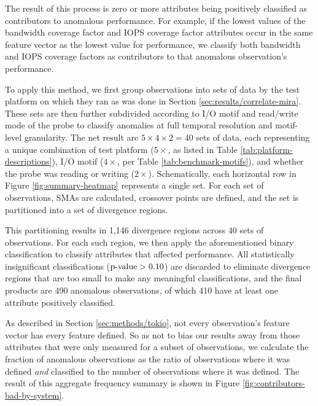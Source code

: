 The result of this process is zero or more attributes being positively classified as contributors to anomalous performance.
For example, if the lowest values of the bandwidth coverage factor and IOPS coverage factor attributes occur in the same feature vector as the lowest value for performance, we classify both bandwidth and IOPS coverage factors as contributors to that anomalous observation's performance.

To apply this method, we first group observations into sets of data by the test platform on which they ran as was done in Section \ref{sec:results/correlate-mira}.
These sets are then further subdivided according to I/O motif and read/write mode of the probe to classify anomalies at full temporal resolution and motif-level granularity.
The net result are $5 \times 4 \times 2 = 40$ sets of data, each representing a unique combination of test platform ($5 \times$, as listed in Table \ref{tab:platform-descriptions}), I/O motif ($4 \times$, per Table \ref{tab:benchmark-motifs}), and whether the probe was reading or writing ($2 \times$).
Schematically, each horizontal row in Figure \ref{fig:summary-heatmap} represents a single set.
For each set of observations, SMAs are calculated, crossover points are defined, and the set is partitioned into a set of divergence regions.

This partitioning results in 1,146 divergence regions across 40 sets of observations.
For each such region, we then apply the aforementioned binary classification to classify attributes that affected performance.
All statistically insignificant classifications ($\textup{p-value} > 0.10$) are discarded to eliminate divergence regions that are too small to make any meaningful classifications, and the final products are 
490 anomalous observations, of which 410 have at least one attribute positively classified.

As described in Section \ref{sec:methods/tokio}, not every observation's feature vector has every feature defined.
So as not to bias our results away from those attributes that were only measured for a subset of observations, we calculate the fraction of anomalous observations 
as the ratio of observations where it was defined \emph{and} classified to the number of observations where it was defined.
The result of this aggregate frequency summary is shown in Figure \ref{fig:contributors-bad-by-system}.

